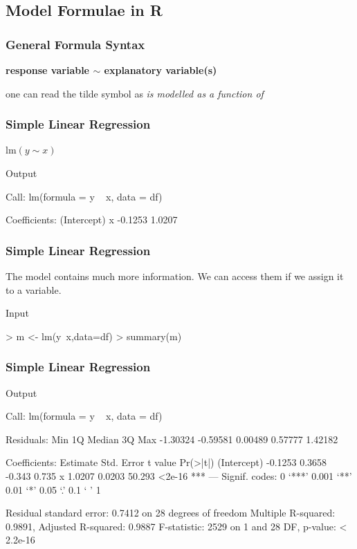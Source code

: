 \documentclass[xcolor={table},handout]{beamer}
\begin{document}
\subsection{Model Formulae in R}
\begin{frame}\frametitle{General Formula Syntax}
\begin{center}
\large 
\textbf{response variable $\sim$ explanatory variable(s)}

\vspace*{1.5cm}

one can read the tilde symbol as \emph{is modelled as a function of}
\end{center}
\end{frame}

\begin{frame}[fragile]\frametitle{Simple Linear Regression}
\begin{center}
\large 
\begin{math}\mbox{lm}(y\sim x)\end{math}
\end{center}
\begin{exampleblock}{Output}
\begin{semiverbatim}
Call:
lm(formula = y ~ x, data = df)

Coefficients:
(Intercept)            x  
    -0.1253       1.0207  
\end{semiverbatim}
\end{exampleblock}
\end{frame}

\begin{frame}[fragile]\frametitle{Simple Linear Regression}
The model contains much more information. We can access them if we assign it to a variable.
\begin{exampleblock}{Input}
\begin{semiverbatim}
> m <- lm(y~x,data=df)
> summary(m)
\end{semiverbatim}
\end{exampleblock}
\end{frame}

\begin{frame}[fragile]\frametitle{Simple Linear Regression}
\begin{exampleblock}{Output}\footnotesize
\begin{semiverbatim}
Call:
lm(formula = y ~ x, data = df)

Residuals:
     Min       1Q   Median       3Q      Max 
-1.30324 -0.59581  0.00489  0.57777  1.42182 

Coefficients:
            Estimate Std. Error t value Pr(>|t|)    
(Intercept)  -0.1253     0.3658  -0.343    0.735    
x             1.0207     0.0203  50.293   <2e-16 ***
---
Signif. codes:  0 ‘***’ 0.001 ‘**’ 0.01 ‘*’ 0.05 ‘.’ 0.1 ‘ ’ 1 

Residual standard error: 0.7412 on 28 degrees of freedom
Multiple R-squared: 0.9891,	Adjusted R-squared: 0.9887 
F-statistic:  2529 on 1 and 28 DF,  p-value: < 2.2e-16 
\end{semiverbatim}
\end{exampleblock}
\end{frame}
\end{document}
